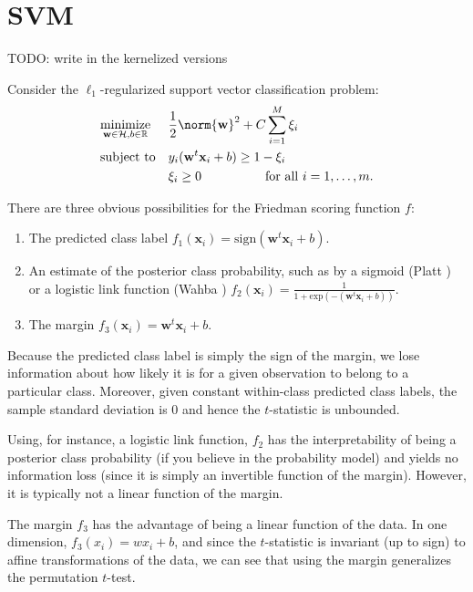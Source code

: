 \section{SVM}
TODO: write in the kernelized versions

Consider the $\ell_1$-regularized support vector classification problem:
\begin{equation*}
\begin{aligned}
& \underset{\mathbf{w} \in \mathcal{H}, b \in \mathbb{R}}{\text{minimize}}
& &\frac{1}{2}\norm{\mathbf{w}}^2+C\sum_{i=1}^M \xi_i \\
& \text{subject to}
& & y_i(\mathbf{w}^t \mathbf{x}_i + b) \geq 1 - \xi_i \\
&&& \xi_i \geq 0 \qquad \qquad \quad \text{for all } i=1,\ldots,m.
\end{aligned}
\end{equation*}

There are three obvious possibilities for the Friedman scoring
function $f$: 
\begin{enumerate}
\item The predicted class label $f_1(\mathbf{x}_i)
= \text{sign}(\mathbf{w}^t \mathbf{x}_i + b)$.
\item An estimate of the posterior class probability, such as by a
sigmoid (Platt \cite{platt1999probabilistic, lin2007note}) or a
logistic link function (Wahba \cite{wahba1992multivariate,
wahba1999support}) 
$f_2(\mathbf{x}_i) = \frac{1}{1 + \text{exp}(-(\mathbf{w}^t \mathbf{x}_i + b))}$.
\item The margin $f_3(\mathbf{x}_i) = \mathbf{w}^t \mathbf{x}_i + b$.
\end{enumerate}

Because the predicted class label is simply the sign of the margin, we
lose information about how likely it is for a given observation
to belong to a particular class.  Moreover, given constant within-class
predicted class labels, the sample standard deviation is $0$ and hence
the $t$-statistic is unbounded.

Using, for instance, a logistic link function, $f_2$ has the
interpretability of being a posterior class probability (if you
believe in the probability model) and yields no information loss
(since it is simply an invertible function of the margin).  However,
it is typically not a linear function of the margin.

The margin $f_3$ has the advantage of being a linear function of the
data.  In one dimension, $f_3(x_i) = w x_i + b$, and since the
$t$-statistic is invariant (up to sign) to affine transformations of
the data, we can see that using the margin generalizes the permutation
$t$-test.  

